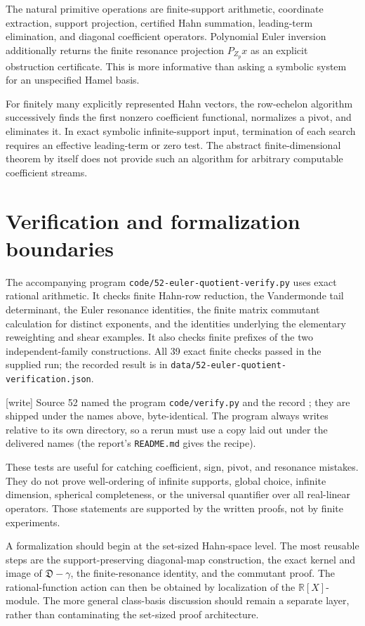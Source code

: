 \documentclass[11pt,letterpaper]{article}
\numberwithin{equation}{section}
\theoremstyle{definition}
\theoremstyle{remark}
\newcommand{\R}{\mathbb{R}}
\newcommand{\EuD}{\mathfrak D}%
\newcommand{\wtag}{\textup{[write]}}%
\begin{document}
The natural primitive operations are finite-support arithmetic, coordinate extraction, support projection, certified Hahn summation, leading-term elimination, and diagonal coefficient operators. Polynomial Euler inversion additionally returns the finite resonance projection $P_{Z_p}x$ as an explicit obstruction certificate. This is more informative than asking a symbolic system for an unspecified Hamel basis.

For finitely many explicitly represented Hahn vectors, the row-echelon algorithm successively finds the first nonzero coefficient functional, normalizes a pivot, and eliminates it. In exact symbolic infinite-support input, termination of each search requires an effective leading-term or zero test. The abstract finite-dimensional theorem by itself does not provide such an algorithm for arbitrary computable coefficient streams.

\section{Verification and formalization boundaries}\label{rvs:eu:sec:verification}
The accompanying program \texttt{code/52-euler-quotient-verify.py} uses exact rational arithmetic. It checks finite Hahn-row reduction, the Vandermonde tail determinant, the Euler resonance identities, the finite matrix commutant calculation for distinct exponents, and the identities underlying the elementary reweighting and shear examples. It also checks finite prefixes of the two independent-family constructions. All 39 exact finite checks passed in the supplied run; the recorded result is in \texttt{data/52-euler-quotient-verification.json}.

\noindent\wtag{} Source 52 named the program \texttt{code/verify.py} and the
record ; they are shipped under the names
above, byte-identical.  The program always writes
 relative to its own directory, so a rerun must use a copy laid out under the
delivered names (the report's \texttt{README.md} gives the recipe).

These tests are useful for catching coefficient, sign, pivot, and resonance mistakes. They do not prove well-ordering of infinite supports, global choice, infinite dimension, spherical completeness, or the universal quantifier over all real-linear operators. Those statements are supported by the written proofs, not by finite experiments.

A formalization should begin at the set-sized Hahn-space level. The most reusable steps are the support-preserving diagonal-map construction, the exact kernel and image of $\EuD-\gamma$, the finite-resonance identity, and the commutant proof. The rational-function action can then be obtained by localization of the $\R[X]$-module. The more general class-basis discussion should remain a separate layer, rather than contaminating the set-sized proof architecture.
\end{document}
